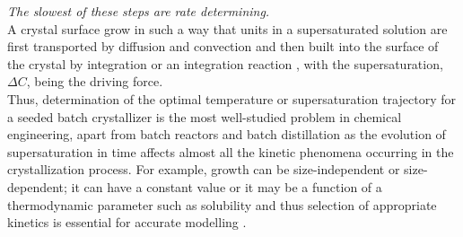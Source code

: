 
\textit{The slowest of these steps are rate determining.} \\

A crystal surface grow in such a way that units in a supersaturated solution are first transported by diffusion and convection and then built into the surface of the crystal by integration or an integration reaction , with the supersaturation, $\Delta{C}$, being the driving force.\\
Thus, determination of the optimal temperature or supersaturation trajectory for a seeded batch crystallizer is the most well-studied problem in chemical engineering, apart from batch reactors and batch distillation as the evolution of supersaturation in time affects almost all the kinetic phenomena occurring in the crystallization process. For example, growth can be size-independent or size-dependent; it can have a constant value or it may be a function of a thermodynamic parameter such as solubility and thus selection of appropriate kinetics is essential for accurate modelling .

